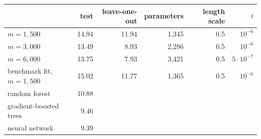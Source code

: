 \begin{tabular}{@{}lrrrrr@{}}
\toprule
& test & leave-one-out & parameters & length scale & $t$ \\
\midrule
$m=1{,}500$ & 14.94 & 11.94 & 1{,}345 & 0.5 & $10^{-6}$ \\
$m=3{,}000$ & 13.49 & 8.93 & 2{,}286 & 0.5 & $10^{-6}$ \\
$m=6{,}000$ & 13.75 & 7.93 & 3{,}421 & 0.5 & $5\cdot10^{-7}$ \\
benchmark fit, $m=1{,}500$ & 15.02 & 11.77 & 1{,}365 & 0.5 & $10^{-6}$ \\
random forest & 10.88 & & & & \\
gradient-boosted trees & 9.46 & & & & \\
neural network & 9.39 & & & & \\
\bottomrule
\end{tabular}
